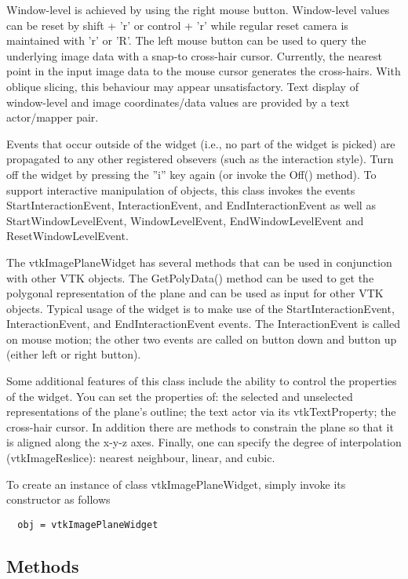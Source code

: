  Window-level is achieved by using the right mouse button.  Window-level
 values can be reset by shift + 'r' or control + 'r' while regular reset
 camera is maintained with 'r' or 'R'.
 The left mouse button can be used to query the underlying image data
 with a snap-to cross-hair cursor.  Currently, the nearest point in the input
 image data to the mouse cursor generates the cross-hairs.  With oblique
 slicing, this behaviour may appear unsatisfactory. Text display of
 window-level and image coordinates/data values are provided by a text
 actor/mapper pair.

 Events that occur outside of the widget (i.e., no part of the widget is
 picked) are propagated to any other registered obsevers (such as the
 interaction style). Turn off the widget by pressing the ''i'' key again
 (or invoke the Off() method). To support interactive manipulation of
 objects, this class invokes the events StartInteractionEvent,
 InteractionEvent, and EndInteractionEvent as well as StartWindowLevelEvent,
 WindowLevelEvent, EndWindowLevelEvent and ResetWindowLevelEvent.

 The vtkImagePlaneWidget has several methods that can be used in
 conjunction with other VTK objects. The GetPolyData() method can be used
 to get the polygonal representation of the plane and can be used as input
 for other VTK objects. Typical usage of the widget is to make use of the
 StartInteractionEvent, InteractionEvent, and EndInteractionEvent
 events. The InteractionEvent is called on mouse motion; the other two
 events are called on button down and button up (either left or right
 button).

 Some additional features of this class include the ability to control the
 properties of the widget. You can set the properties of: the selected and
 unselected representations of the plane's outline; the text actor via its
 vtkTextProperty; the cross-hair cursor. In addition there are methods to
 constrain the plane so that it is aligned along the x-y-z axes.  Finally,
 one can specify the degree of interpolation (vtkImageReslice): nearest
 neighbour, linear, and cubic.

To create an instance of class vtkImagePlaneWidget, simply
invoke its constructor as follows
\begin{verbatim}
  obj = vtkImagePlaneWidget
\end{verbatim}
\subsection{Methods}

